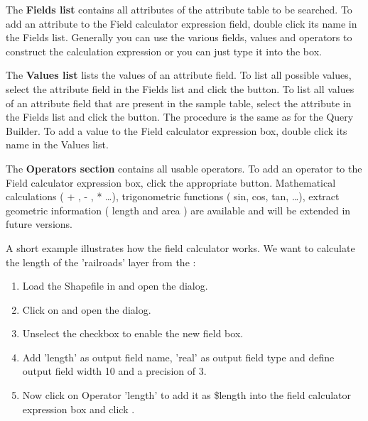The \textbf{Fields list} contains all attributes of the attribute table to be
searched. To add an attribute to the Field calculator expression field, double
click its name in the Fields list. Generally you can use the various fields,
values and operators to construct the calculation expression or you can just
type it into the box.

The \textbf{Values list} lists the values of an attribute field. To list all
possible values, select the attribute field in the Fields list and click the
 button. To list all
values of an attribute field that are present in the sample table, select the
attribute in the Fields list and click the  button. The procedure is the same as for the Query
Builder. To add a value to the Field calculator expression box, double click its
name in the Values list.

The \textbf{Operators section} contains all usable operators. To add an operator
to the Field calculator expression box, click the appropriate button. Mathematical
calculations ( + , - , * \dots), trigonometric functions ( sin, cos, tan, \dots),
extract geometric information ( length and area ) are available and will be
extended in future versions.

A short example illustrates how the field calculator works. We want to calculate
the length of the 'railroads' layer from the :

\begin{enumerate}
\item Load the Shapefile  in \qg and open
the  dialog.
\item Click on  and
open the  dialog.
\item Unselect the  checkbox to enable the
new field box.
\item Add 'length' as output field name, 'real' as output field type and define
output field width 10 and a precision of 3.
\item Now click on Operator 'length' to add it as \$length into the
field calculator expression box and click .
\end{enumerate}

